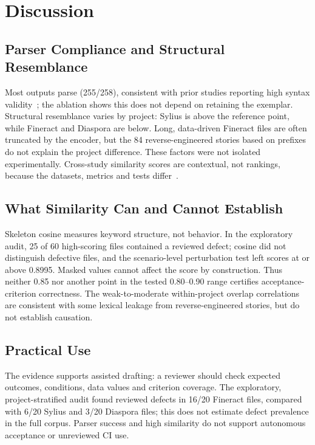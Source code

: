 \section{Discussion}
\label{sec:discussion}

\subsection{Parser Compliance and Structural Resemblance}

Most outputs parse (255/258), consistent with prior studies reporting high syntax validity~\cite{karpurapu2024,fonseca2025,ferreira2025}; the ablation shows this does not depend on retaining the exemplar. Structural resemblance varies by project: Sylius is above the reference point, while Fineract and Diaspora are below. Long, data-driven Fineract files are often truncated by the encoder, but the 84 reverse-engineered stories based on prefixes do not explain the project difference. These factors were not isolated experimentally. Cross-study similarity scores are contextual, not rankings, because the datasets, metrics and tests differ~\cite{rathnayake2026,fernandes2025}.

\subsection{What Similarity Can and Cannot Establish}

Skeleton cosine measures keyword structure, not behavior. In the exploratory audit, 25 of 60 high-scoring files contained a reviewed defect; cosine did not distinguish defective files, and the scenario-level perturbation test left scores at or above 0.8995. Masked values cannot affect the score by construction. Thus neither 0.85 nor another point in the tested 0.80--0.90 range certifies acceptance-criterion correctness. The weak-to-moderate within-project overlap correlations are consistent with some lexical leakage from reverse-engineered stories, but do not establish causation.

\subsection{Practical Use}

The evidence supports assisted drafting: a reviewer should check expected outcomes, conditions, data values and criterion coverage. The exploratory, project-stratified audit found reviewed defects in 16/20 Fineract files, compared with 6/20 Sylius and 3/20 Diaspora files; this does not estimate defect prevalence in the full corpus. Parser success and high similarity do not support autonomous acceptance or unreviewed CI use.
